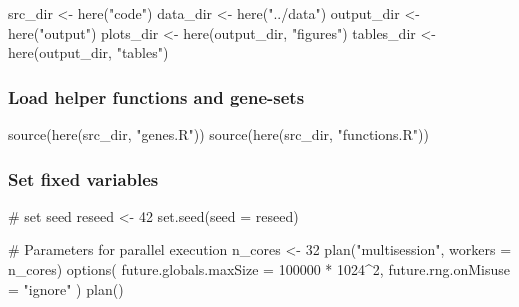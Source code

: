 \documentclass[
  letterpaper,
  DIV=11,
  numbers=noendperiod]{scrartcl}
\newenvironment{Shaded}{\begin{snugshade}}{\end{snugshade}}
\newcommand{\AttributeTok}[1]{\textcolor[rgb]{0.40,0.45,0.13}{#1}}
\newcommand{\CommentTok}[1]{\textcolor[rgb]{0.37,0.37,0.37}{#1}}
\newcommand{\DecValTok}[1]{\textcolor[rgb]{0.68,0.00,0.00}{#1}}
\newcommand{\FunctionTok}[1]{\textcolor[rgb]{0.28,0.35,0.67}{#1}}
\newcommand{\NormalTok}[1]{\textcolor[rgb]{0.00,0.23,0.31}{#1}}
\newcommand{\OtherTok}[1]{\textcolor[rgb]{0.00,0.23,0.31}{#1}}
\newcommand{\SpecialCharTok}[1]{\textcolor[rgb]{0.37,0.37,0.37}{#1}}
\newcommand{\StringTok}[1]{\textcolor[rgb]{0.13,0.47,0.30}{#1}}
\begin{document}
\begin{Shaded}
\begin{Highlighting}[]
\NormalTok{src\_dir }\OtherTok{\textless{}{-}} \FunctionTok{here}\NormalTok{(}\StringTok{"code"}\NormalTok{)}
\NormalTok{data\_dir }\OtherTok{\textless{}{-}} \FunctionTok{here}\NormalTok{(}\StringTok{"../data"}\NormalTok{)}
\NormalTok{output\_dir }\OtherTok{\textless{}{-}} \FunctionTok{here}\NormalTok{(}\StringTok{"output"}\NormalTok{)}
\NormalTok{plots\_dir }\OtherTok{\textless{}{-}} \FunctionTok{here}\NormalTok{(output\_dir, }\StringTok{"figures"}\NormalTok{)}
\NormalTok{tables\_dir }\OtherTok{\textless{}{-}} \FunctionTok{here}\NormalTok{(output\_dir, }\StringTok{"tables"}\NormalTok{)}
\end{Highlighting}
\end{Shaded}

\hypertarget{load-helper-functions-and-gene-sets}{%
\subsubsection{Load helper functions and
gene-sets}\label{load-helper-functions-and-gene-sets}}

\begin{Shaded}
\begin{Highlighting}[]
\FunctionTok{source}\NormalTok{(}\FunctionTok{here}\NormalTok{(src\_dir, }\StringTok{"genes.R"}\NormalTok{))}
\FunctionTok{source}\NormalTok{(}\FunctionTok{here}\NormalTok{(src\_dir, }\StringTok{"functions.R"}\NormalTok{))}
\end{Highlighting}
\end{Shaded}

\hypertarget{set-fixed-variables}{%
\subsubsection{Set fixed variables}\label{set-fixed-variables}}

\begin{Shaded}
\begin{Highlighting}[]
\CommentTok{\# set seed}
\NormalTok{reseed }\OtherTok{\textless{}{-}} \DecValTok{42}
\FunctionTok{set.seed}\NormalTok{(}\AttributeTok{seed =}\NormalTok{ reseed)}

\CommentTok{\# Parameters for parallel execution}
\NormalTok{n\_cores }\OtherTok{\textless{}{-}} \DecValTok{32}
\FunctionTok{plan}\NormalTok{(}\StringTok{"multisession"}\NormalTok{, }\AttributeTok{workers =}\NormalTok{ n\_cores)}
\FunctionTok{options}\NormalTok{(}
  \AttributeTok{future.globals.maxSize =} \DecValTok{100000} \SpecialCharTok{*} \DecValTok{1024}\SpecialCharTok{\^{}}\DecValTok{2}\NormalTok{,}
  \AttributeTok{future.rng.onMisuse =} \StringTok{"ignore"}
\NormalTok{)}
\FunctionTok{plan}\NormalTok{()}
\end{Highlighting}
\end{Shaded}
\end{document}
